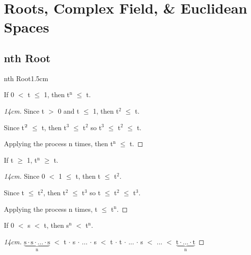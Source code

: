 \newpage

\section[Day 2: Complex Field \& Euclidean Spaces]
{ Roots, Complex Field, \& Euclidean Spaces }

\subsection{ nth Root }

	\begin{ltheorem}{nth Root}{1.5cm}
		\item If 0 $<$ t $\leq$ 1, then t$^\text{n}$ $ \leq $ t.
		
			\begin{proof}[14cm]
				Since t $>$ 0 and t $\leq$ 1, then t$^\text{2}$ $\leq$ t.

				Since t$^\text2{}$ $\leq$ t, then t$^\text{3}$ $\leq$ t$^\text{2}$
				so t$^\text{3}$ $\leq$ t$^\text{2}$ $\leq$ t.

				Applying the process n times, then t$^\text{n}$ $\leq$ t.
			\end{proof}

		\item If t $\geq$ 1, t$^\text{n}$ $ \geq $ t.

			\begin{proof}[14cm]
				Since 0 $<$ 1 $\leq$ t, then t $\leq$ t$^\text{2}$.

				Since t $\leq$ t$^\text{2}$, then t$^\text{2}$ $\leq$ t$^\text{3}$
				so t $\leq$ t$^\text{2}$ $\leq$ t$^\text{3}$.

				Applying the process n times, t $\leq$ t$^\text{n}$.
			\end{proof}

		\item If 0 $<$ s $<$ t, then s$^\text{n}$ $<$ t$^\text{n}$.

			\begin{proof}[14cm]
				$\underbrace{\text{s} \cdot \text{s} \cdot
								... \cdot \text{s}}_\text{n}$
				$<$ t $\cdot$ s $\cdot$ ... $\cdot$ s
				$<$ t $\cdot$ t $\cdot$ ... $\cdot$ s $<$ ... $<$
				$\underbrace{\text{t} \cdot ... \cdot \text{t}}_\text{n}$
			\end{proof}
	\end{ltheorem}

	\vspace{0.5cm}



